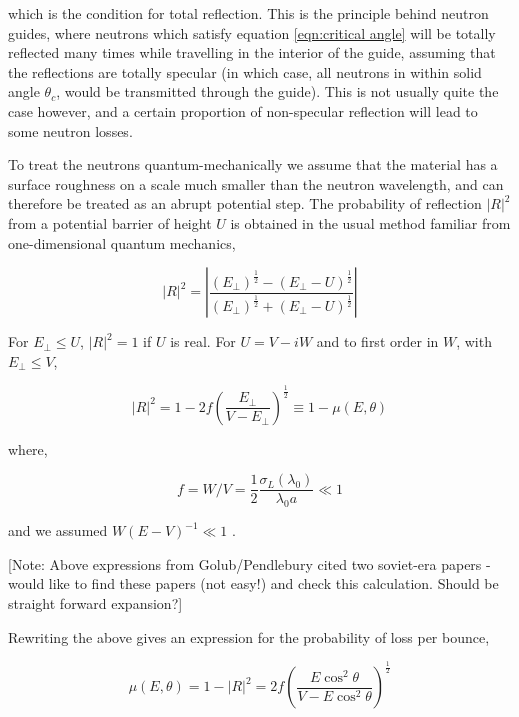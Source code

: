 \documentclass[11pt,a4paper,oneside]{article}
\begin{document}
which is the condition for total reflection. This is the principle behind neutron guides, where neutrons which satisfy equation \ref{eqn:critical angle} will be totally reflected many times while travelling in the interior of the guide, assuming that the reflections are totally specular (in which case, all neutrons in within solid angle $\theta_{c}$, would be transmitted through the guide). This is not usually quite the case however, and a certain proportion of non-specular reflection will lead to some neutron losses. 

To treat the neutrons quantum-mechanically we assume that the material has a surface roughness on a scale much smaller than the neutron wavelength, and can therefore be treated as an abrupt potential step. The probability of reflection $|R|^{2}$ from a potential barrier of height $U$ is obtained in the usual method familiar from one-dimensional quantum mechanics, 

\begin{equation}
|R|^{2} = \left| \frac{(E_{\bot})^{\frac{1}{2}} - (E_{\bot} - U)^{\frac{1}{2}}}{(E_{\bot})^{\frac{1}{2}} + (E_{\bot} - U)^{\frac{1}{2}}} \right|
\label{eqn:probreflection}
\end{equation}

For $E_{\bot} \leqslant U$, $|R|^{2} = 1$ if $U$ is real. For $U = V - iW$ and to first order in $W$, with $E_{\bot} \leqslant V$,

\begin{equation}
|R|^{2} = 1 - 2f \left( \frac{E_{\bot}}{V - E_{\bot}} \right)^{\frac{1}{2}} \equiv 1 - \mu (E, \theta)
\label{eqn:probreflection2}
\end{equation}

where, 

\begin{equation}
f = W/V = \frac{1}{2} \frac{\sigma_{L}(\lambda_{0})}{\lambda_{0}a} \ll 1
\label{eqn:f}
\end{equation}

and we assumed $W(E - V)^{-1} \ll 1$ \cite{Go.Ri.La.91}.

[Note: Above expressions from Golub/Pendlebury cited two soviet-era papers - would like to find these papers (not easy!) and check this calculation. Should be straight forward expansion?]

Rewriting the above gives an expression for the probability of loss per bounce,

\begin{equation}
\mu (E, \theta) = 1 - |R|^{2} = 2f\left( \frac{E\cos^{2}\theta}{V - E\cos^{2}\theta} \right)^{\frac{1}{2}}
\label{eqn:lossprobabilityperbounce}
\end{equation}
\end{document}
